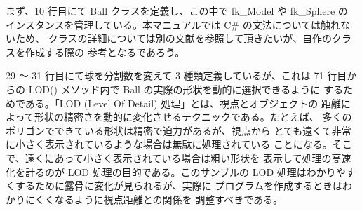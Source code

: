 まず、10 行目にて Ball クラスを定義し、この中で fk\_Model や fk\_Sphere の
インスタンスを管理している。本マニュアルでは C\# の文法については触れないため、
クラスの詳細については別の文献を参照して頂きたいが、自作のクラスを作成する際の
参考となるであろう。


29 〜 31 行目にて球を分割数を変えて 3 種類定義しているが、これは
71 行目からの LOD() メソッド内で Ball の実際の形状を動的に選択できるように
するためである。「LOD (Level Of Detail) 処理」とは、視点とオブジェクトの
距離によって形状の精密さを動的に変化させるテクニックである。たとえば、
多くのポリゴンでできている形状は精密で迫力があるが、視点から
とても遠くて非常に小さく表示されているような場合は無駄に処理されている
ことになる。そこで、遠くにあって小さく表示されている場合は粗い形状を
表示して処理の高速化を計るのが LOD 処理の目的である。このサンプルの
LOD 処理はわかりやすくするために露骨に変化が見られるが、実際に
プログラムを作成するときはわかりにくくなるように視点距離との関係を
調整すべきである。
\\
